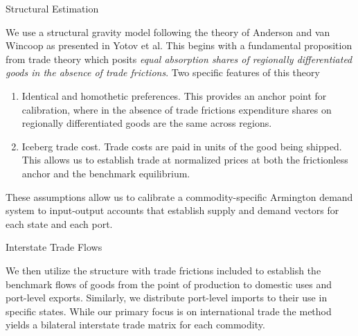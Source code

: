 \documentclass[10pt]{beamer}
\begin{document}
\begin{frame}{Structural Estimation}

We use a structural gravity model following the theory of Anderson and
van Wincoop as presented in Yotov et al. This begins with a
fundamental proposition from trade theory which posits \textit{equal
absorption shares of regionally differentiated goods in the absence of
trade frictions}.  Two specific features of this theory

\begin{enumerate}

	\item Identical and homothetic preferences. This provides an
anchor point for calibration, where in the absence of trade frictions
expenditure shares on regionally differentiated goods are the same
across regions. 

	\item Iceberg trade cost. Trade costs are paid in units of the
good being shipped. This allows us to establish trade at normalized
prices at both the frictionless anchor and the benchmark equilibrium. 

\end{enumerate}

These assumptions allow us to calibrate a commodity-specific Armington
demand system to input-output accounts that establish supply and
demand vectors for each state and each port.

\end{frame}

\begin{frame}{Interstate Trade Flows}

We then utilize the structure with trade frictions included to
establish the benchmark flows of goods from the point of production to
domestic uses and port-level exports. Similarly, we distribute
port-level imports to their use in specific states. While our primary
focus is on international trade the method yields a bilateral
interstate trade matrix for each commodity.

\end{frame}
\end{document}
